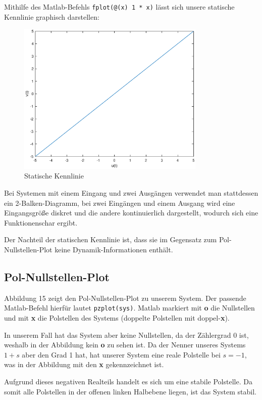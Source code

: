 Mithilfe des Matlab-Befehls \texttt{fplot(@(x) 1 * x)} lässt sich unsere statische Kennlinie graphisch darstellen:

\begin{figure}[H]
    \label{fig:staticCurve}
    \centering
    \includegraphics[width=0.8\textwidth]{Bilder/StaticCurvePT1Tt.eps}
    \caption{Statische Kennlinie}
 \end{figure}

Bei Systemen mit einem Eingang und zwei Ausgängen verwendet man stattdessen ein 2-Balken-Diagramm, bei zwei Eingängen und einem Ausgang wird eine Eingangsgröße diskret und die andere kontinuierlich dargestellt, wodurch sich eine Funktionenschar ergibt. 

Der Nachteil der statischen Kennlinie ist, dass sie im Gegensatz zum Pol-Nullstellen-Plot keine Dynamik-Informationen enthält.

\subsection{Pol-Nullstellen-Plot}
Abbildung 15 zeigt den Pol-Nullstellen-Plot zu unserem System. Der passende Matlab-Befehl hierfür lautet \texttt{pzplot(sys)}. Matlab markiert mit \textbf{o} die Nullstellen und mit \textbf{x} die Polstellen des Systems (doppelte Polstellen mit doppel-\textbf{x}).

In unserem Fall hat das System aber keine Nullstellen, da der Zählergrad 0 ist, weshalb in der Abbildung kein \textbf{o} zu sehen ist. Da der Nenner unseres Systems  $1 + s$ aber den Grad 1 hat, hat unserer System eine reale Polstelle bei $s = -1$, was in der Abbildung mit den \textbf{x} gekennzeichnet ist. 

Aufgrund dieses negativen Realteils handelt es sich um eine stabile Polstelle. Da somit alle Polstellen in der offenen linken Halbebene liegen, ist das System stabil. 


